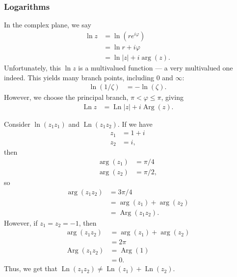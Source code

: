 \documentclass[10pt]{mypackage}
\DeclareMathOperator{\Ln}{Ln}
\DeclareMathOperator{\Arg}{Arg}
\begin{document}
\subsubsection{Logarithms}%
In the complex plane, we say
\begin{align*}
  \ln z &= \ln\left(re^{i\varphi} \right)\\
        &= \ln r + i\varphi\\
        &= \ln \left\vert z \right\vert + i\arg(z).
\end{align*}
Unfortunately, this $\ln z$ is a multivalued function --- a very multivalued one indeed. This yields many branch points, including $0$ and $\infty$:
\begin{align*}
  \ln\left( 1/\zeta \right) &= -\ln\left( \zeta \right).
\end{align*}
However, we choose the principal branch, $\pi < \varphi \leq \pi$, giving
\begin{align*}
  \Ln z &= \Ln \left\vert z \right\vert + i\Arg(z).
\end{align*}
\begin{example}
  Consider $\ln\left( z_1z_1 \right)$ and $\Ln\left( z_1z_2 \right)$. If we have
  \begin{align*}
    z_1 &= 1 + i\\
    z_2 &= i,
  \end{align*}
  then
  \begin{align*}
    \arg\left(z_1\right) &= \pi/4\\
    \arg\left( z_2 \right) &= \pi/2,
  \end{align*}
  so
  \begin{align*}
    \arg\left( z_1z_2 \right) &= 3\pi/4\\
                              &= \arg\left(z_1\right) + \arg\left( z_2 \right)\\
                              &= \Arg\left( z_1z_2 \right).
  \end{align*}
  However, if $z_1 = z_2 = -1$, then
  \begin{align*}
    \arg\left( z_1z_2 \right) &= \arg\left( z_1 \right) + \arg\left( z_2 \right)\\
                              &= 2\pi\\
    \Arg\left( z_1z_2 \right) &= \Arg\left( 1 \right)\\
                              &= 0.
  \end{align*}
  Thus, we get that $\Ln\left( z_1z_2 \right)\neq \Ln\left( z_1 \right) + \Ln\left( z_2 \right)$.
\end{example}
\end{document}
